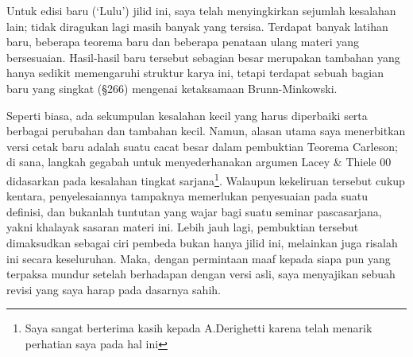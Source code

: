\medskip

Untuk edisi baru (`Lulu') jilid ini, saya telah menyingkirkan sejumlah
kesalahan lain; tidak diragukan lagi masih banyak yang tersisa. Terdapat
banyak latihan baru, beberapa teorema baru
dan beberapa penataan ulang materi yang bersesuaian.
Hasil-hasil baru tersebut sebagian besar merupakan tambahan yang hanya
sedikit memengaruhi struktur karya ini, tetapi terdapat sebuah bagian baru
yang singkat (\S266) mengenai ketaksamaan Brunn-Minkowski.

\bigskip


\medskip

Seperti biasa, ada sekumpulan kesalahan kecil yang harus diperbaiki serta
berbagai perubahan dan tambahan kecil. Namun, alasan utama saya menerbitkan
versi cetak baru adalah suatu cacat besar dalam pembuktian Teorema Carleson;
di sana, langkah gegabah untuk menyederhanakan argumen {\smc Lacey \& Thiele
00} didasarkan pada kesalahan tingkat sarjana\footnote{Saya sangat
berterima kasih kepada A.Derighetti karena telah menarik perhatian saya
pada hal ini}.
Walaupun kekeliruan tersebut cukup kentara, penyelesaiannya tampaknya
memerlukan penyesuaian pada suatu definisi, dan bukanlah tuntutan yang
wajar bagi suatu seminar pascasarjana, yakni khalayak sasaran materi ini.
Lebih jauh lagi, pembuktian tersebut dimaksudkan sebagai ciri
pembeda bukan hanya jilid ini, melainkan juga risalah ini secara
keseluruhan. Maka, dengan permintaan maaf kepada siapa pun yang terpaksa
mundur setelah berhadapan dengan versi asli, saya menyajikan sebuah revisi
yang saya harap pada dasarnya sahih.

\frnewpage 
 
